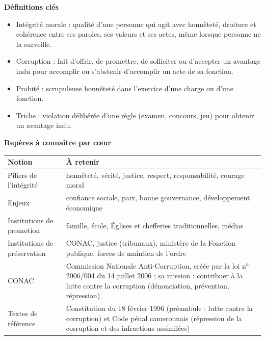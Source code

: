 \documentclass[11pt]{article}
\newcommand{\cle}[1]{{\popxbold\color{popdark}#1}}
\begin{document}
\begin{aretenir}
\textbf{Définitions clés}
\begin{itemize}
\item \cle{Intégrité morale} : qualité d'une personne qui agit avec honnêteté, droiture et cohérence entre ses paroles, ses valeurs et ses actes, même lorsque personne ne la surveille.
\item \cle{Corruption} : fait d'offrir, de promettre, de solliciter ou d'accepter un avantage indu pour accomplir ou s'abstenir d'accomplir un acte de sa fonction.
\item \cle{Probité} : scrupuleuse honnêteté dans l'exercice d'une charge ou d'une fonction.
\item \cle{Triche} : violation délibérée d'une règle (examen, concours, jeu) pour obtenir un avantage indu.
\end{itemize}

\textbf{Repères à connaître par cœur}
\begin{center}
\begin{tabularx}{\linewidth}{|l|X|}\hline
\rowcolor{popblueL} \textbf{Notion} & \textbf{À retenir} \\ \hline
Piliers de l'intégrité & honnêteté, vérité, justice, respect, responsabilité, courage moral \\ \hline
Enjeux & confiance sociale, paix, bonne gouvernance, développement économique \\ \hline
Institutions de promotion & famille, école, Églises et chefferies traditionnelles, médias \\ \hline
Institutions de préservation & CONAC, justice (tribunaux), ministère de la Fonction publique, forces de maintien de l'ordre \\ \hline
CONAC & Commission Nationale Anti-Corruption, créée par la loi n° 2006/004 du 14 juillet 2006 ; sa mission : contribuer à la lutte contre la corruption (dénonciation, prévention, répression) \\ \hline
Textes de référence & Constitution du 18 février 1996 (préambule : lutte contre la corruption) et Code pénal camerounais (répression de la corruption et des infractions assimilées) \\ \hline
\end{tabularx}
\end{center}


\end{aretenir}
\end{document}
